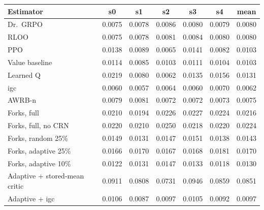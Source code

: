 \begin{tabular}{lcccccc}
\toprule
Estimator & s0 & s1 & s2 & s3 & s4 & mean\\
\midrule
Dr.~GRPO & 0.0075 & 0.0078 & 0.0086 & 0.0080 & 0.0079 & 0.0080 \\
RLOO & 0.0075 & 0.0078 & 0.0081 & 0.0084 & 0.0080 & 0.0080 \\
PPO & 0.0138 & 0.0089 & 0.0065 & 0.0141 & 0.0082 & 0.0103 \\
Value baseline & 0.0114 & 0.0085 & 0.0103 & 0.0111 & 0.0104 & 0.0103 \\
Learned Q & 0.0219 & 0.0080 & 0.0062 & 0.0135 & 0.0156 & 0.0131 \\
igc & 0.0060 & 0.0057 & 0.0064 & 0.0060 & 0.0070 & 0.0062 \\
AWRB-n & 0.0079 & 0.0081 & 0.0072 & 0.0072 & 0.0073 & 0.0075 \\
Forks, full & 0.0210 & 0.0194 & 0.0226 & 0.0227 & 0.0224 & 0.0216 \\
Forks, full, no CRN & 0.0220 & 0.0210 & 0.0250 & 0.0218 & 0.0220 & 0.0224 \\
Forks, random 25\% & 0.0149 & 0.0131 & 0.0147 & 0.0151 & 0.0138 & 0.0143 \\
Forks, adaptive 25\% & 0.0166 & 0.0170 & 0.0167 & 0.0168 & 0.0181 & 0.0170 \\
Forks, adaptive 10\% & 0.0122 & 0.0131 & 0.0147 & 0.0133 & 0.0118 & 0.0130 \\
Adaptive + stored-mean critic & 0.0911 & 0.0808 & 0.0731 & 0.0946 & 0.0859 & 0.0851 \\
Adaptive + igc & 0.0106 & 0.0087 & 0.0097 & 0.0105 & 0.0092 & 0.0097 \\
\bottomrule
\end{tabular}
